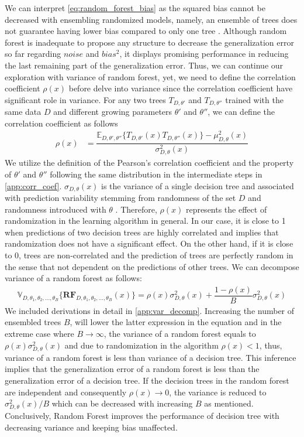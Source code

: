 We can interpret \autoref{eq:random_forest_bias} as the squared bias cannot be decreased with ensembling randomized models, 
namely, an ensemble of trees does not guarantee having lower bias compared to only one tree \cite{friedman2001elements}.
Although random forest is inadequate to propose any structure to decrease the generalization error so far regarding $noise$ 
and $bias^2$, it displays promising performance in reducing the last remaining part of the generalization error. 
Thus, we can continue our exploration with variance of random forest, yet, we need to define the correlation coefficient $\rho(x)$
before delve into variance since the correlation coefficient have significant role in variance. 
For any two trees $T_{D,\theta'}$ and $T_{D,\theta''}$ trained with the same data $D$
and different growing parameters $\theta'$ and $\theta''$, we can define the correlation coefficient as follows
\begin{align}
	\rho(x) & 
	= \dfrac{\mathbb{E}_{D,\theta',\theta''}\{T_{D,\theta'}(x) T_{D,\theta''}(x)\} 
	- \mu_{D,\theta}^2(x)}{\sigma_{D,\theta}^2(x)}
\end{align}
We utilize the definition of the Pearson's correlation coefficient and the property of $\theta'$ and $\theta''$ following 
the same distribution in the intermediate steps in \autoref{app:corr_coef}. 
$\sigma_{D, \theta}(x)$ is the variance of a single decision tree and 
associated with prediction variability stemming from randomness of the set $D$ 
and randomness introduced with $\theta$ \cite{louppe2014understanding}.
Therefore, $\rho(x)$ represents the effect of randomization in the learning algorithm in general.
In our case, it is close to 1 when predictions of two decision trees are highly correlated and implies that randomization 
does not have a significant effect. 
On the other hand, if it is close to 0, trees are non-correlated and 
the prediction of trees are perfectly random in the sense that 
not dependent on the predictions of other trees. 
We can decompose variance of a random forest as follows:
\begin{align}\label{eq:decomp_var}
\mathbb{V}_{D, \theta_{1}, \theta_{2},..., \theta_{B}}\{\boldsymbol{RF}_{D, \theta_{1},\theta_{2},..., \theta_{B}}(x) \}  = \rho(x)\sigma^2_{D,\theta}(x) + \dfrac{1-\rho(x)}{B}\sigma^2_{D,\theta}(x)
\end{align}
We included derivations in detail in \autoref{app:var_decomp}. 
Increasing the number of ensembled trees $B$, will lower the latter expression in the equation and in the extreme 
case where $B \rightarrow \infty $, the variance of a random forest equals to $\rho(x)\sigma^2_{D,\theta}(x)$ 
and due to randomization in the algorithm $\rho(x) < 1$, 
thus, variance of a random forest is less than variance of a decision tree. 
This inference implies that the generalization error of a random forest is less than the generalization error of a decision tree. 
If the decision trees in the random forest are independent 
and consequently $\rho(x) \rightarrow 0$, the variance is reduced to $\sigma^2_{D,\theta}(x)/B$ 
which can be decreased with increasing $B$ as mentioned. 
Conclusively, Random Forest improves the performance of decision tree with decreasing variance and keeping bias unaffected.

